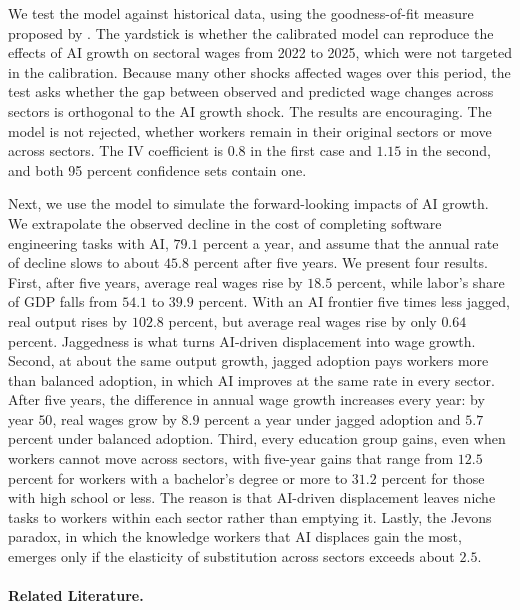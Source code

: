 \documentclass[11pt]{article}
\begin{document}
We test the model against historical data, using the goodness-of-fit
measure proposed by \citet{adao2025test}. The yardstick is whether
the calibrated model can reproduce the effects of AI growth on sectoral
wages from 2022 to 2025, which were not targeted in the calibration.
Because many other shocks affected wages over this period, the test
asks whether the gap between observed and predicted wage changes across
sectors is orthogonal to the AI growth shock. The results are encouraging.
The model is not rejected, whether workers remain in their original
sectors or move across sectors. The IV coefficient is $0.8$
in the first case and $1.15$ in the second, and
both 95 percent confidence sets contain one.

Next, we use the model to simulate the forward-looking impacts of
AI growth. We extrapolate the observed decline in the cost of completing
software engineering tasks with AI, $79.1$ percent
a year, and assume that the annual rate of decline slows to about
$45.8$ percent after five years.
We present four results. First, after five years, average real wages
rise by $18.5$ percent,
while labor's share of GDP falls from $54.1$
to $39.9$ percent. With an
AI frontier five times less jagged, real output rises by $102.8$
percent, but average real wages rise by only $0.64$
percent. Jaggedness is what turns AI-driven displacement into wage
growth. Second, at about the same output growth, jagged adoption pays
workers more than balanced adoption, in which AI improves at the same
rate in every sector. After five years, the difference in annual wage
growth increases every year: by year $50$, real
wages grow by $8.9$ percent
a year under jagged adoption and $5.7$
percent under balanced adoption. Third, every education group gains,
even when workers cannot move across sectors, with five-year gains
that range from $12.5$ percent for workers
with a bachelor's degree or more to $31.2$
percent for those with high school or less. The reason is that AI-driven
displacement leaves niche tasks to workers within each sector rather
than emptying it. Lastly, the Jevons paradox, in which the knowledge
workers that AI displaces gain the most, emerges only if the elasticity
of substitution across sectors exceeds about $2.5$.

\paragraph*{Related Literature.}
\end{document}
